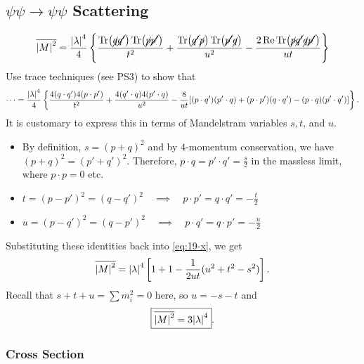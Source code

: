 
\subsection{\texorpdfstring{$\psi\psi \to\psi\psi$}{Psi-Psi} Scattering}%
\label{sub:psi_psi_scattering}

\begin{equation}
  \overline{\abs{M}^2} = \frac{\abs{\lambda}^4}{4} \left\{ \frac{\Tr(\cancel{q} \cancel{q'}) \Tr( \cancel{p} \cancel{p'})}{t^2} + \frac{\Tr(\cancel{q'}\cancel{p}) \Tr(\cancel{p'}\cancel{q})}{u^2} - \frac{2 \Re \Tr(\cancel{p} \cancel{q'} \cancel{q} \cancel{p'})}{ut} \right\}
\end{equation}
Use trace techniques (see PS3) to show that
\begin{equation}
  \label{eq:19-x}
  \dots = \frac{\abs{\lambda}^4}{4} \left\{ \frac{4 (q \cdot q') 4 (p \cdot p')}{t^2} + \frac{4 (q' \cdot q) 4 (p' \cdot q)}{u^2} - \frac{8}{ut} [(p \cdot q') (p' \cdot q) + (p \cdot p') (q \cdot q') - (p \cdot q) (p' \cdot q')] \right\}.
\end{equation}
It is customary to express this in terms of Mandelstram variables $s, t$, and $u$.
 \begin{itemize}
   \item By definition, $s = (p+q)^2$ and by $4$-momentum conservation, we have  $(p + q)^2 = (p' + q')^2$. Therefore, $p \cdot q = p' \cdot q' = \frac{s}{2}$ in the massless limit, where $p \cdot p = 0$ etc.
   \item $t = (p - p')^2 = (q - q')^2 \quad \implies \quad p \cdot p' = q \cdot q' = -\frac{t}{2}$
   \item $u = (p - q')^2 = (q - p')^2 \quad \implies \quad p \cdot q' = q \cdot p' = -\frac{u}{2}$
\end{itemize}
Substituting these identities back into \eqref{eq:19-x}, we get
\begin{equation}
  \overline{\abs{M}^2} = \abs{\lambda}^4 \left[ 1 +1 - \frac{1}{2 ut} (u^2 + t^2 - s^2) \right].
\end{equation}
Recall that $s + t + u = \sum m_{i}^2 = 0$  here, so $u = -s - t$  and 
\begin{equation}
  \boxed{\overline{\abs{M}^2} = 3 \abs{\lambda}^4}.
\end{equation}

\subsubsection{Cross Section}%
\label{subsub:cross_section}


